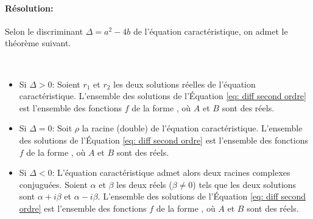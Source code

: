             \paragraph{R\'esolution:}
                  Selon le discriminant $\Delta = a^2 - 4b$ de l'\'equation caract\'eristique, on admet le th\'eor\`eme suivant. \\
                  \noindent
	                        \begin{thm} ~
                              \begin{itemize}
                              \item Si $\Delta > 0$:
                                    Soient $r_1$ et $r_2$ les deux solutions r\'eelles de l'\'equation caract\'eristique.
                                    L'ensemble des solutions de l'\'Equation \ref{eq: diff second ordre} est
                                    l'ensemble des fonctions $f$ de la forme
                                    , o\`u $A$ et $B$ sont des r\'eels.
                              \item Si $\Delta = 0$: Soit $\rho$ la racine (double) de l'\'equation caract\'eristique.
                                    L'ensemble des solutions de l'\'Equation \ref{eq: diff second ordre} est
                                    l'ensemble des fonctions $f$ de la forme
	                                    , o\`u $A$ et $B$ sont des r\'eels.
                              \item Si $\Delta < 0$:
                                    L'\'equation caract\'eristique admet alors deux racines complexes conjugu\'ees.
                                    Soient $\alpha$ et $\beta$ les deux r\'eels ($\beta \neq 0$) tels que
                                    les deux solutions sont $\alpha + i \beta$ et $\alpha - i \beta$.
                                    L'ensemble des solutions de l'\'Equation \ref{eq: diff second ordre} est
                                    l'ensemble des fonctions $f$ de la forme
                                    , o\`u $A$ et $B$ sont des r\'eels.
                              \end{itemize}
	                        \end{thm}
